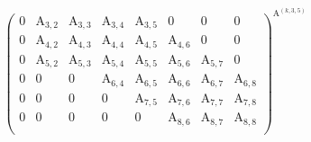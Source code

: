 \documentclass{article}
\newcommand\matA{\boldsymbol{\mathrm{A}}}
\begin{document}
\begin{align}
{\begin{pmatrix}
        0  & \matA_{3,2}  &\matA_{3,3}   & \matA_{3,4}   & \matA_{3,5} & 0           & 0           & 0           \\
        0            & \matA_{4,2}  &\matA_{4,3}   & \matA_{4,4}   & \matA_{4,5} & \matA_{4,6} & 0           & 0           \\
        0            & \boxed{\matA_{5,2}} &\matA_{5,3}   & \matA_{5,4}   & \matA_{5,5} & \matA_{5,6} & \matA_{5,7} & 0           \\
        0            & 0            & 0            & \matA_{6,4}   & \matA_{6,5} & \matA_{6,6} & \matA_{6,7} & \matA_{6,8} \\
        0            & 0            & 0            & 0             & \matA_{7,5} & \matA_{7,6} & \matA_{7,7} & \matA_{7,8} \\
        0            & 0            & 0            & 0             & 0           & \matA_{8,6} & \matA_{8,7} & \matA_{8,8} \\
    \end{pmatrix}
    }^{
        \matA^{(k,3,5)}
    }
\end{align}
\endgroup
\end{document}
